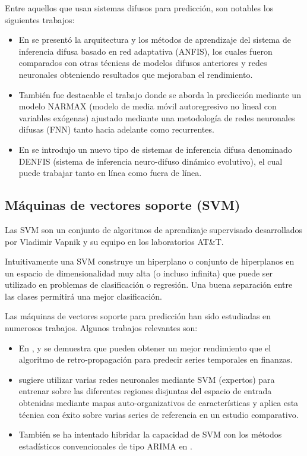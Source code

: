 \documentclass{llncs}
\begin{document}
Entre aquellos que usan sistemas difusos para predicción, son notables los siguientes trabajos:

\begin{itemize}

\item En \cite{jang1993anfis} se presentó la arquitectura y los métodos de aprendizaje del sistema de inferencia difusa basado en red adaptativa (ANFIS), los cuales fueron comparados con otras técnicas de modelos difusos anteriores y redes neuronales obteniendo resultados que mejoraban el rendimiento.

\item También fue destacable el trabajo \cite{gao2005narmax}  donde se aborda la predicción mediante un modelo NARMAX (modelo de media móvil autoregresivo no lineal con variables exógenas) ajustado mediante una metodología de redes neuronales difusas (FNN) tanto hacia adelante como recurrentes.

\item En \cite{kasabov2002denfis} se introdujo un nuevo tipo de sistemas de inferencia difusa denominado DENFIS (sistema de inferencia neuro-difuso dinámico evolutivo), el cual puede trabajar tanto en línea como fuera de línea.

\end{itemize}

\subsection{Máquinas de vectores soporte (SVM)}
Las SVM son un conjunto de algoritmos de aprendizaje supervisado desarrollados por Vladimir Vapnik y su equipo en los laboratorios AT\&T.

Intuitivamente una SVM construye un hiperplano o conjunto de hiperplanos en un espacio de dimensionalidad muy alta (o incluso infinita) que puede ser utilizado en problemas de clasificación o regresión. Una buena separación entre las clases permitirá una mejor clasificación.

Las máquinas de vectores soporte para predicción han sido estudiadas en numerosos trabajos. Algunos trabajos relevantes son:
\begin{itemize}

\item En \cite{cao2003support}, \cite{Tay2001309} y \cite{kim2003financial} se demuestra que pueden obtener un mejor rendimiento que el algoritmo de retro-propagación para predecir series temporales en finanzas. 
\item \cite{Cao2003321} sugiere utilizar varias redes neuronales mediante SVM (expertos) para entrenar sobre las diferentes regiones disjuntas del espacio de entrada obtenidas mediante mapas auto-organizativos de características y aplica esta técnica con éxito sobre varias series de referencia en un estudio comparativo.
\item También se ha intentado hibridar la capacidad de SVM con los métodos estadísticos convencionales de tipo ARIMA en \cite{pai2005hybrid}.
 
\end{itemize}
\end{document}
